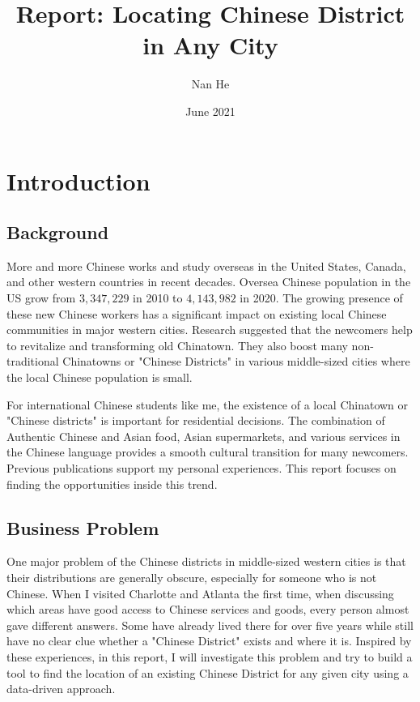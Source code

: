 \documentclass{article}
\title{Report: Locating Chinese District in Any City}
\author{Nan He}
\date{June 2021}
\begin{document}
\maketitle

\section{Introduction}
\subsection{Background}
More and more Chinese works and study overseas in the United States, Canada, and other western countries in recent decades.
Oversea Chinese population in the US grow from $3,347,229$ in 2010 to $4,143,982$ in 2020.\cite{census2010chi, census2020chi}
The growing presence of these new Chinese workers has a significant impact on existing local Chinese communities in major western cities.
Research suggested that the newcomers help to revitalize and transforming old Chinatown. \cite{jia2010chinatown}
They also boost many non-traditional Chinatowns or "Chinese Districts" in various middle-sized cities where the local Chinese population is small.

For international Chinese students like me, the existence of a local Chinatown or "Chinese districts" is important for residential decisions.
The combination of Authentic Chinese and Asian food, Asian supermarkets, and various services in the Chinese language provides a smooth cultural transition for many newcomers. Previous publications support my personal experiences.\cite{zhou2010chinatown} This report focuses on finding the opportunities inside this trend.

\subsection{Business Problem}
One major problem of the Chinese districts in middle-sized western cities is that their distributions are generally obscure, especially for someone who is not Chinese.
When I visited Charlotte and Atlanta the first time, when discussing which areas have good access to Chinese services and goods, every person almost gave different answers.
Some have already lived there for over five years while still have no clear clue whether a "Chinese District" exists and where it is.
Inspired by these experiences, in this report, I will investigate this problem and try to build a tool to find the location of an existing Chinese District for any given city using a data-driven approach.
\end{document}
